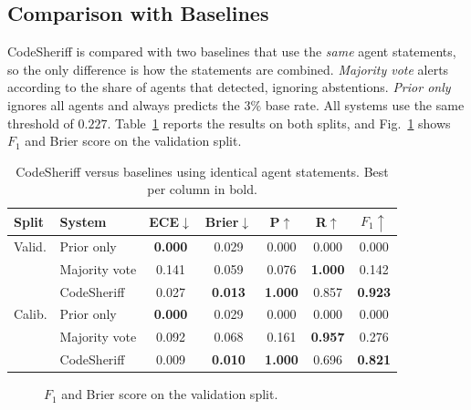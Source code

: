 \documentclass[conference]{IEEEtran}
\begin{document}
\subsection{Comparison with Baselines}
CodeSheriff is compared with two baselines that use the \emph{same}
agent statements, so the only difference is how the statements are
combined. \emph{Majority vote} alerts according to the share of agents
that detected, ignoring abstentions. \emph{Prior only} ignores all agents
and always predicts the $3\%$ base rate. All systems use the same threshold
of $0.227$. Table~\ref{tab:comparison} reports the results on both splits,
and Fig.~\ref{fig:compare} shows $F_1$ and Brier score on the validation
split.

\begin{table}[t]
\centering
\caption{CodeSheriff versus baselines using identical agent statements.
Best per column in bold.}
\label{tab:comparison}
\small
\setlength{\tabcolsep}{3.5pt}
\begin{tabular}{llccccc}
\toprule
Split & System & ECE$\downarrow$ & Brier$\downarrow$ & P$\uparrow$ & R$\uparrow$ & $F_1\uparrow$ \\
\midrule
Valid.
 & Prior only    & \textbf{0.000} & 0.029 & 0.000 & 0.000 & 0.000 \\
 & Majority vote & 0.141 & 0.059 & 0.076 & \textbf{1.000} & 0.142 \\
 & CodeSheriff   & 0.027 & \textbf{0.013} & \textbf{1.000} & 0.857 & \textbf{0.923} \\
\midrule
Calib.
 & Prior only    & \textbf{0.000} & 0.029 & 0.000 & 0.000 & 0.000 \\
 & Majority vote & 0.092 & 0.068 & 0.161 & \textbf{0.957} & 0.276 \\
 & CodeSheriff   & 0.009 & \textbf{0.010} & \textbf{1.000} & 0.696 & \textbf{0.821} \\
\bottomrule
\end{tabular}
\end{table}

\begin{figure}[t]
\centering
{}
\caption{$F_1$ and Brier score on the validation split.}
\label{fig:compare}
\end{figure}
\end{document}
